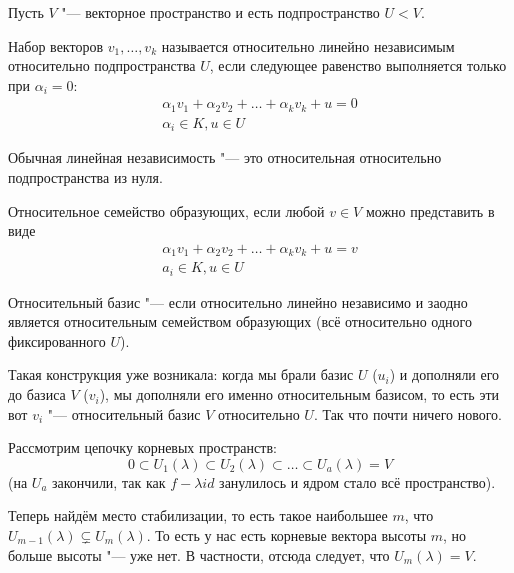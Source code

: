 Пусть $V$ "--- векторное пространство и есть подпространство $U < V$.
\begin{Def}
	Набор векторов $v_1, \dots, v_k$ называется относительно линейно независимым относительно подпространства $U$,
	если следующее равенство выполняется только при $\alpha_i = 0$:
	\begin{gather*}
	\alpha_1 v_1 + \alpha_2 v_2 + \dots + \alpha_k v_k + u = 0 \\
	\alpha_i \in K, u \in U
	\end{gather*}
\end{Def}
\begin{Rem}
	Обычная линейная независимость "--- это относительная относительно подпространства из нуля.
\end{Rem}
\begin{Def}
	Относительное семейство образующих, если любой $v \in V$ можно представить в виде
	\begin{gather*}
	\alpha_1 v_1 + \alpha_2 v_2 + \dots + \alpha_k v_k + u = v \\
	a_i \in K, u \in U
	\end{gather*}
\end{Def}
\begin{Def}
	Относительный базис "--- если относительно линейно независимо и заодно является относительным семейством образующих
	(всё относительно одного фиксированного $U$).
\end{Def}
\begin{Rem}
	Такая конструкция уже возникала: когда мы брали базис $U$ ($u_i$) и дополняли его до базиса $V$ ($v_i$), мы дополняли его именно относительным базисом,
	то есть эти вот $v_i$ "--- относительный базис $V$ относительно $U$.
	Так что почти ничего нового.
\end{Rem}

Рассмотрим цепочку корневых пространств:
\[ {0} \subset U_1(\lambda) \subset U_2(\lambda) \subset \dots \subset U_a(\lambda) = V \]
(на $U_a$ закончили, так как $f-\lambda id$ занулилось и ядром стало всё пространство).

Теперь найдём место стабилизации, то есть
такое наибольшее $m$, что $U_{m-1}(\lambda) \subsetneq U_m(\lambda)$.
То есть у нас есть корневые вектора высоты $m$, но больше высоты "--- уже нет.
В частности, отсюда следует, что $U_m(\lambda) = V$.

